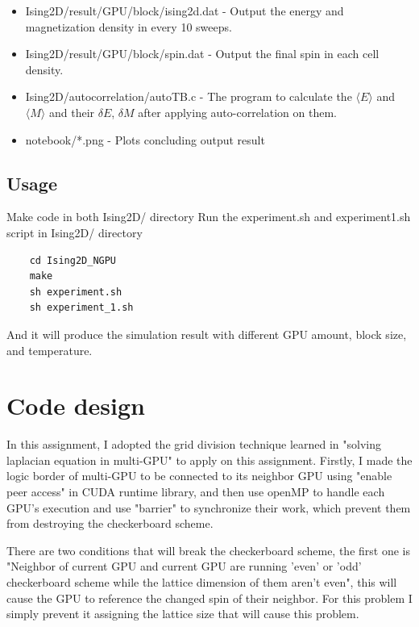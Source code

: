 \documentclass{article}
\begin{document}
\begin{itemize}
		\item Ising2D/result/GPU\textunderscore*/block\textunderscore{*}/ising2d.dat - Output the energy and magnetization density in every 10 sweeps.
		\item Ising2D/result/GPU\textunderscore*/block\textunderscore{*}/spin.dat - Output the final spin in each cell density.
		\item Ising2D/auto\textunderscore correlation/autoT\textunderscore B.c - The program to calculate the $\langle E\rangle$ and $\langle M\rangle$ and their $\delta E$, $\delta M$ after applying auto-correlation on them.

		\item notebook/*.png - Plots concluding output result
	\end{itemize}
	
	
	\subsection{Usage}
	Make code in both Ising2D/ directory
	Run the experiment.sh and experiment\textunderscore 1.sh script in Ising2D/ directory
	
	\begin{verbatim}
	cd Ising2D_NGPU
	make
	sh experiment.sh
	sh experiment_1.sh
	\end{verbatim}
	
	And it will produce the simulation result with different GPU amount, block size, and temperature.
	
	\section{Code design}
	In this assignment, I adopted the grid division technique learned in "solving laplacian equation in multi-GPU" to apply on this assignment. Firstly, I made the logic border of multi-GPU to be connected to its neighbor GPU using "enable peer access" in CUDA runtime library, and then use openMP to handle each GPU's execution and use "barrier" to synchronize their work, which prevent them from destroying the checkerboard scheme.
	
	There are two conditions that will break the checkerboard scheme, the first one is "Neighbor of current GPU and current GPU are running 'even' or 'odd' checkerboard scheme while the lattice dimension of them aren't even", this will cause the GPU to reference the changed spin of their neighbor. For this problem I simply prevent it assigning the lattice size that will cause this problem.
	
\end{document}
